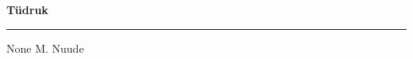 \documentclass[10pt]{book}
\begin{document}
{
  \samepage
  \raggedbottom
  \raggedright
  \sloppy


  \vspace{0.2in}

  \noindent\begin{minipage}{.1\textwidth}
    \hfill\vspace{0.1in}
  \end{minipage}%
  \noindent\begin{minipage}{.8\textwidth}
    \centering
    \bfseries
    \large T\"udruk
  \end{minipage}%
  \noindent\begin{minipage}{.1\textwidth}
      \hfill\vspace{0.1in}
  \end{minipage}

  \nopagebreak[4]
  \vspace{0.1in}
  \nopagebreak[4]
  \hrule height 0.05ex
  \nopagebreak[4]
  \vspace{-0.05in}

  {\footnotesize None \hfill M. Nuude }\\
  \vspace{0.01in}



}
\end{document}
